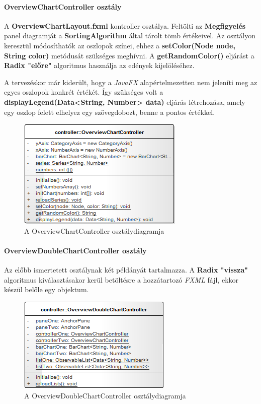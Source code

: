 \documentclass{elteikthesis}
\begin{document}
\paragraph{OverviewChartController osztály}
A \textbf{OverviewChartLayout.fxml} kontroller osztálya. Feltölti az \textbf{Megfigyelés} panel diagramját a \textbf{SortingAlgorithm} által tárolt tömb értékeivel. Az osztályon keresztül módosíthatók az oszlopok színei, ehhez a \textbf{setColor(Node node, String color)} metódusát szükséges meghívni. A \textbf{getRandomColor()} eljárást a \textbf{Radix "előre"} algoritmus használja az edények kijelöléséhez. \par
A tervezéskor már kiderült, hogy a \emph{JavaFX} alapértelmezetten nem jeleníti meg az egyes oszlopok konkrét értékét. Így szükséges volt a \textbf{displayLegend(Data<String, Number> data)} eljárás létrehozása, amely egy oszlop felett elhelyez egy szövegdobozt, benne a pontos értékkel.
\begin{figure}[H]
	\centering
	\includegraphics{pics/class/OverviewChartController.png}
	\caption{A OverviewChartController osztálydiagramja}
\end{figure}
\paragraph{OverviewDoubleChartController osztály}
Az előbb ismertetett osztálynak két példányát tartalmazza. A \textbf{Radix "vissza"} algoritmus kiválasztásakor kerül betöltésre a hozzátartozó \emph{FXML} fájl, ekkor készül belőle egy objektum.
\begin{figure}[H]
	\centering
	\includegraphics{pics/class/OverviewDoubleChartController.png}
	\caption{A OverviewDoubleChartController osztálydiagramja}
\end{figure}
\end{document}

